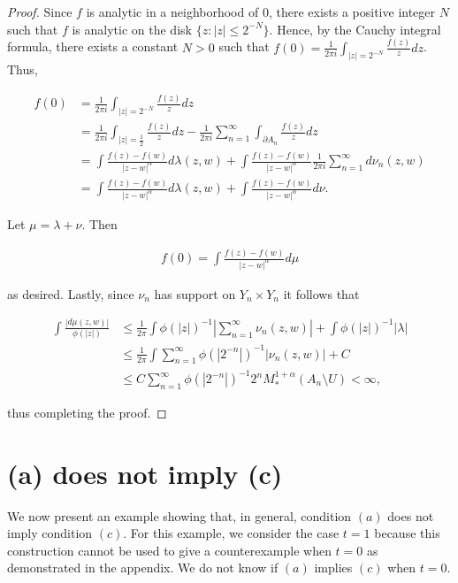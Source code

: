 \documentclass{article}
\theoremstyle{definition}
\begin{document}
\begin{proof}
 Since $f$ is analytic in a neighborhood of $0$, there exists a positive integer $N$ such that $f$ is analytic on the disk $\{z:|z| \leq 2^{-N}\}$. Hence, by the Cauchy integral formula, there exists a constant $N>0$ such that $\displaystyle f(0) = \frac{1}{2\pi i}\int_{|z|=2^{-N}} \frac{f(z)}{z}dz$. Thus,

\begin{align*}
f(0) &= \frac{1}{2\pi i}\int_{|z|=2^{-N}} \frac{f(z)}{z}dz\\
 &= \frac{1}{2\pi i}  \int_{|z|=\frac{1}{2}} \frac{f(z)}{z} dz - \frac{1}{2\pi i} \sum_{n=1}^{\infty} \int_{\partial A_n} \frac{f(z)}{z} dz\\
    &= \int \frac{f(z)-f(w)}{|z-w|^{\alpha}} d\lambda(z,w) + \int \frac{f(z)-f(w)}{|z-w|^{\alpha}} \frac{1}{2\pi i} \sum_{n=1}^{\infty} d\nu_n(z,w)\\
     &= \int \frac{f(z)-f(w)}{|z-w|^{\alpha}} d\lambda(z,w) + \int \frac{f(z)-f(w)}{|z-w|^{\alpha}} d\nu.
\end{align*}

\noindent Let $\mu = \lambda + \nu$. Then 

\begin{align*}
    f(0) = \int \frac{f(z) - f(w)}{|z-w|^{\alpha}} d \mu
\end{align*}

\noindent as desired. Lastly, since $\nu_n$ has support on $Y_n \times Y_n$ it follows that

\begin{align*}
    \int \frac{|d\mu(z,w)|}{\phi(|z|)} &\leq \frac{1}{2\pi} \int \phi(|z|)^{-1} \left| \sum_{n=1}^{\infty} \nu_n(z,w) \right| + \int \phi(|z|)^{-1} |\lambda|\\
    &\leq\frac{1}{2\pi} \int \sum_{n=1}^{\infty} \phi(|2^{-n}|)^{-1} |\nu_n(z,w)| + C\\
    &\leq C \sum_{n=1}^{\infty}  \phi(|2^{-n}|)^{-1} 2^n M_*^{1+\alpha}(A_n \setminus U) < \infty,
\end{align*}

\noindent thus completing the proof.
    
\end{proof}


\section{(a) does not imply (c)}

We now present an example showing that, in general, condition $(a)$ does not imply condition $(c)$. For this example, we consider the case $t=1$ because this construction cannot be used to give a counterexample when $t=0$ as demonstrated in the appendix. We do not know if $(a)$ implies $(c)$ when $t=0$.
\end{document}
